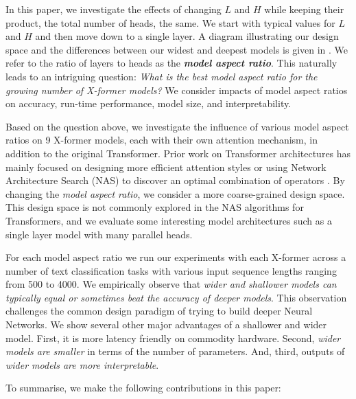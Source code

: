 In this paper, we investigate the effects of changing $L$ and $H$ while keeping their product, the total number of heads, the same.
We start with typical values for $L$ and $H$ and then move down to a single layer.
A diagram illustrating our design space and the differences between our widest and deepest models is given in .
We refer to the ratio of layers to heads as the \textbf{\emph{model aspect ratio}}.
This naturally leads to an intriguing question: \textit{What is the best model aspect ratio for the growing number of X-former models?}
We consider impacts of model aspect ratios on accuracy, run-time performance, model size, and interpretability.

Based on the question above, we investigate the influence of various model aspect ratios on 9 X-former models, each with their own attention mechanism, in addition to the original Transformer.
Prior work on Transformer architectures has mainly focused on designing more efficient attention styles \citep{linformer,performer} or using Network Architecture Search (NAS) to discover an optimal combination of operators \citep{so2019evolved}.
By changing the \emph{model aspect ratio}, we consider a more coarse-grained design space. This design space is not commonly explored in the NAS algorithms for Transformers, and we evaluate some interesting model architectures such as a single layer model with many parallel heads.

For each model aspect ratio we run our experiments with each X-former across a number of text classification tasks with various input sequence lengths ranging from 500 to 4000.
We empirically observe that \emph{wider and shallower models can typically equal or sometimes beat the accuracy of deeper models}.
This observation challenges the common design paradigm of trying to build deeper Neural Networks.
We show several other major advantages of a shallower and wider model.
First, it is more latency friendly on commodity hardware.
Second, \emph{wider models are smaller} in terms of the number of parameters.
And, third, outputs of \emph{wider models are more interpretable}.

To summarise, we make the following contributions in this paper:

